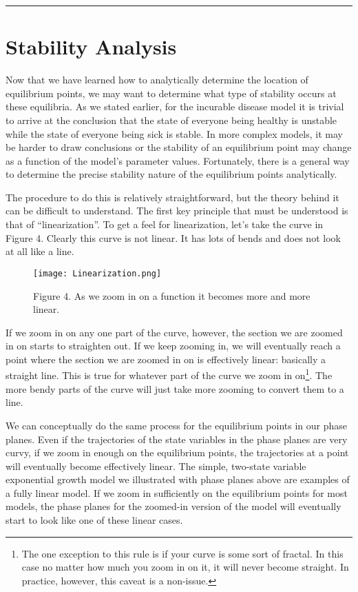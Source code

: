 \documentclass[]{memoir}
\makeatletter
\def\maxwidth{\ifdim\Gin@nat@width>\linewidth\linewidth
\else\Gin@nat@width\fi}
\let\Oldincludegraphics\includegraphics
\renewcommand{\includegraphics}[1]{\Oldincludegraphics[width=\maxwidth]{#1}}
\makeatother
\begin{document}
\begin{center}\rule{3in}{0.4pt}\end{center}

\section{Stability Analysis}

Now that we have learned how to analytically determine the location of
equilibrium points, we may want to determine what type of stability
occurs at these equilibria. As we stated earlier, for the incurable
disease model it is trivial to arrive at the conclusion that the state
of everyone being healthy is unstable while the state of everyone being
sick is stable. In more complex models, it may be harder to draw
conclusions or the stability of an equilibrium point may change as a
function of the model's parameter values. Fortunately, there is a
general way to determine the precise stability nature of the equilibrium
points analytically.

The procedure to do this is relatively straightforward, but the theory
behind it can be difficult to understand. The first key principle that
must be understood is that of ``linearization''. To get a feel for
linearization, let's take the curve in Figure 4. Clearly this curve is
not linear. It has lots of bends and does not look at all like a line.

\begin{figure}[htbp]
\centering
\texttt{[image: Linearization.png]}
\caption{Figure 4. As we zoom in on a function it becomes more and more
linear.}
\end{figure}

If we zoom in on any one part of the curve, however, the section we are
zoomed in on starts to straighten out. If we keep zooming in, we will
eventually reach a point where the section we are zoomed in on is
effectively linear: basically a straight line. This is true for whatever
part of the curve we zoom in on\footnote{The one exception to this rule
  is if your curve is some sort of fractal. In this case no matter how
  much you zoom in on it, it will never become straight. In practice,
  however, this caveat is a non-issue.}. The more bendy parts of the
curve will just take more zooming to convert them to a line.

We can conceptually do the same process for the equilibrium points in
our phase planes. Even if the trajectories of the state variables in the
phase planes are very curvy, if we zoom in enough on the equilibrium
points, the trajectories at a point will eventually become effectively
linear. The simple, two-state variable exponential growth model we
illustrated with phase planes above are examples of a fully linear
model. If we zoom in sufficiently on the equilibrium points for most
models, the phase planes for the zoomed-in version of the model will
eventually start to look like one of these linear cases.
\end{document}
